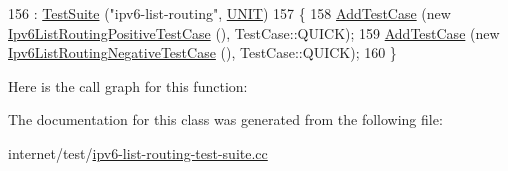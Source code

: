 \begin{DoxyCode}
156     : \hyperlink{classns3_1_1TestSuite_a904b0c40583b744d30908aeb94636d1a}{TestSuite} (\textcolor{stringliteral}{"ipv6-list-routing"}, \hyperlink{classns3_1_1TestSuite_a1ebfcab34ec8161e085e8e3a1855eae0a3885375a3787abf60431f8454b3cadbd}{UNIT})
157   \{
158     \hyperlink{classns3_1_1TestCase_a3718088e3eefd5d6454569d2e0ddd835}{AddTestCase} (\textcolor{keyword}{new} \hyperlink{classIpv6ListRoutingPositiveTestCase}{Ipv6ListRoutingPositiveTestCase} (), 
      TestCase::QUICK);
159     \hyperlink{classns3_1_1TestCase_a3718088e3eefd5d6454569d2e0ddd835}{AddTestCase} (\textcolor{keyword}{new} \hyperlink{classIpv6ListRoutingNegativeTestCase}{Ipv6ListRoutingNegativeTestCase} (), 
      TestCase::QUICK);
160   \}
\end{DoxyCode}


Here is the call graph for this function\+:




The documentation for this class was generated from the following file\+:\begin{DoxyCompactItemize}
\item 
internet/test/\hyperlink{ipv6-list-routing-test-suite_8cc}{ipv6-\/list-\/routing-\/test-\/suite.\+cc}\end{DoxyCompactItemize}
